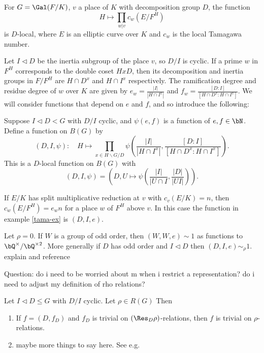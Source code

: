 \begin{example}\label{tama-ex}
    For $G = \Gal(F / K)$, $v$ a place of $K$ with decomposition group $D$, the function
    \[ H \mapsto \prod_{w | v} c_w(E / F^{H}) \]
    is $D$-local, where $E$ is an elliptic curve over $K$ and $c_w$ is the local Tamagawa number. 
\end{example}

Let $I \triangleleft D$ be the inertia subgroup of the place $v$, so $D / I$ is cyclic. If a prime $w$ in $F^H$ corresponds to the double coset $HxD$, then its decomposition and inertia groups in $F / F^H$ are $H \cap D^x$ and $H \cap I^x$ respectively.
The ramification degree and residue degree of $w$ over $K$ are given by $e_w = \frac{|I|}{|H \cap I^x|}$ and $f_w = \frac{[D \colon I]}{[H \cap D^x \colon H \cap I^x]}$. We will consider functions that depend on $e$ and $f$, and so introduce the following:

\begin{defn}\cite[Definition 2.35]{reg-const}\label{D-I-fn}
    Suppose $I \triangleleft D < G$ with $D / I$ cyclic, and $\psi(e,f)$ is a function of $e, f \in \bN$. Define a function on $B(G)$ by 
    \[ \left(D, I, \psi\right) \colon \quad H \mapsto \prod_{x \in H\backslash G / D} \psi\left(\frac{|I|}{|H \cap I^x|}, \frac{[D \colon I]}{[H \cap D^x \colon H \cap I^x]}\right). \]
    This is a $D$-local function on $B(G)$ with
    \[ (D, I, \psi) = \left(D, U \mapsto \psi(\frac{|I|}{|U \cap I}, \frac{|D|}{|UI|})\right). \]
\end{defn}

\begin{example}
    If $E / K$ has split multiplicative reduction at $v$ with $c_v(E / K) = n$, then $c_w(E / F^H) = e_w n$ for a place $w$ of $F^H$ above $v$. In this case the function in example \ref{tama-ex} is $(D, I, e)$. 
\end{example}

\begin{example}\label{trivial-on-brauer}
    Let $\rho = 0$. If $W$ is a group of odd order, then $(W, W, e) \sim 1$ as functions to $\bQ^{\times} / \bQ^{\times 2}$.
    More generally if $D$ has odd order and $I \triangleleft D$ then $(D, I, e) \sim_{\rho} 1$. {\color{red} explain and reference}
\end{example}

{\color{red} Question: do i need to be worried about m when i restrict a representation? do i need to adjust my definition of rho relations?}
\begin{prop}
    Let $I \triangleleft D \leq G$ with $D / I$ cyclic. Let $\rho \in R(G)$ Then
    \begin{enumerate}
        \item If $f = (D, f_D)$ and $f_D$ is trivial on $(\Res_D \rho)$-relations, then $f$ is trivial on $\rho$-relations.
        \item {\color{red} maybe more things to say here. See e.g. \cite[Theorem 2.36]{reg-const}}  
    \end{enumerate}
\end{prop}



